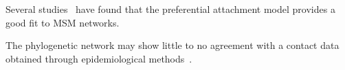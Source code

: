 Several studies~\autocite{little2014using, wang2015targeting,
brown2011transmission, schneeberger2004scale} have found that the preferential
attachment model provides a good fit to MSM networks.

The phylogenetic network may show little to no agreement with a contact data
obtained through epidemiological methods~\autocite{yirrell1998molecular,
resik2007limitations}.
